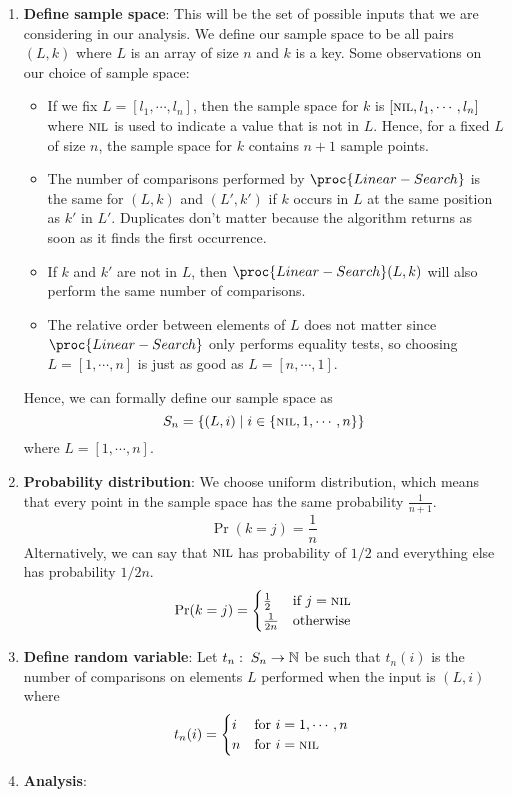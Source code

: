 \begin{enumerate}
    \item \textbf{Define sample space}: This will be the set of possible inputs that we are considering in our analysis. We define our sample space to be all pairs $(L,k)$ where $L$ is an array of size $n$ and $k$ is a key. Some observations on our choice of sample space:
    \begin{itemize}
        \item If we fix $L = [l_1, \cdots, l_n]$, then the sample space for $k$ is $[\textsc{nil}, l_1,\cdots,l_n]$ where $\textsc{nil}$ is used to indicate a value that is not in $L$. Hence, for a fixed $L$ of size $n$, the sample space for $k$ contains $n+1$ sample points.
        \item The number of comparisons performed by $\proc{Linear-Search}$ is the same for $(L,k)$ and $(L',k')$ if $k$ occurs in $L$ at the same position as $k'$ in $L'$. Duplicates don't matter because the algorithm returns as soon as it finds the first occurrence.
        \item If $k$ and $k'$ are not in $L$, then $\proc{Linear-Search}(L,k)$ will also perform the same number of comparisons.
        \item The relative order between elements of $L$ does not matter since $\proc{Linear-Search}$ only performs equality tests, so choosing $L=[1,\cdots,n]$ is just as good as $L=[n,\cdots,1]$.
    \end{itemize}
    Hence, we can formally define our sample space as
    $$
    S_n = \{ (L,i) \mid i \in \{ \textsc{nil}, 1, \cdots, n \} \}
    $$
    where $L = [1,\cdots,n]$.
    \item \textbf{Probability distribution}: We choose uniform distribution, which means that every point in the sample space has the same probability $\displaystyle \frac{1}{n+1}$. 
    $$
    \Pr(k=j) = \frac{1}{n}
    $$
    Alternatively, we can say that $\textsc{nil}$ has probability of $1/2$ and everything else has probability $1/2n$.
    $$
    \Pr(k=j) = \begin{cases}
        \frac{1}{2} & \text{if $j=\textsc{nil}$} \\
        \frac{1}{2n} & \text{otherwise}
    \end{cases}
    $$
    \item \textbf{Define random variable}: Let $t_n:\; S_n \to \mathbb{N}$ be such that $t_n(i)$ is the number of comparisons on elements $L$ performed when the input is $(L,i)$ where
    $$
    t_n(i) = \begin{cases}
        i & \text{for $i=1,\cdots,n$ } \\
        n & \text{for $i=\textsc{nil}$ }
    \end{cases}
    $$
    \item \textbf{Analysis}:


\end{enumerate}
